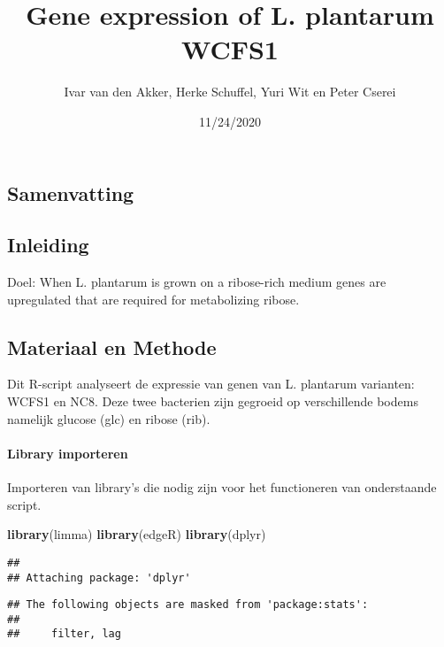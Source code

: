 \documentclass[
]{article}
\title{Gene expression of L. plantarum WCFS1}
\author{Ivar van den Akker, Herke Schuffel, Yuri Wit en Peter Cserei}
\date{11/24/2020}
\newenvironment{Shaded}{\begin{snugshade}}{\end{snugshade}}
\newcommand{\KeywordTok}[1]{\textcolor[rgb]{0.13,0.29,0.53}{\textbf{#1}}}
\newcommand{\NormalTok}[1]{#1}
\begin{document}
\maketitle

{
\setcounter{tocdepth}{4}
\tableofcontents
}
\hypertarget{samenvatting}{%
\subsection{Samenvatting}\label{samenvatting}}

\hypertarget{inleiding}{%
\subsection{Inleiding}\label{inleiding}}

Doel: When L. plantarum is grown on a ribose-rich medium genes are
upregulated that are required for metabolizing ribose.

\hypertarget{materiaal-en-methode}{%
\subsection{Materiaal en Methode}\label{materiaal-en-methode}}

Dit R-script analyseert de expressie van genen van L. plantarum
varianten: WCFS1 en NC8. Deze twee bacterien zijn gegroeid op
verschillende bodems namelijk glucose (glc) en ribose (rib).

\hypertarget{library-importeren}{%
\paragraph{Library importeren}\label{library-importeren}}

Importeren van library's die nodig zijn voor het functioneren van
onderstaande script.

\begin{Shaded}
\begin{Highlighting}[]
\KeywordTok{library}\NormalTok{(limma)}
\KeywordTok{library}\NormalTok{(edgeR)}
\KeywordTok{library}\NormalTok{(dplyr)}
\end{Highlighting}
\end{Shaded}

\begin{verbatim}
## 
## Attaching package: 'dplyr'
\end{verbatim}

\begin{verbatim}
## The following objects are masked from 'package:stats':
## 
##     filter, lag
\end{verbatim}
\end{document}
